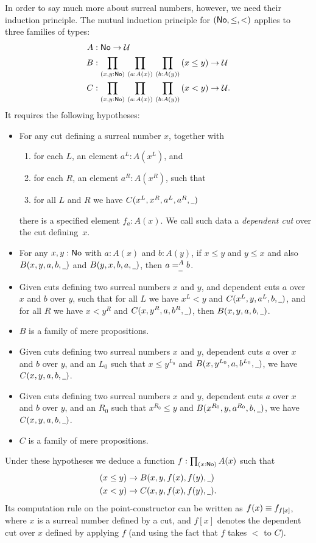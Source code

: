 In order to say much more about surreal numbers, however, we need their induction principle.
The mutual induction principle for $(\NO,\le,<)$ applies to three families of types:
\begin{align*}
  A &: \NO\to\type\\
  B &: \prd{x,y:\NO}{a:A(x)}{b:A(y)} (x\le y) \to \type\\
  C &: \prd{x,y:\NO}{a:A(x)}{b:A(y)} (x<y) \to \type.
\end{align*}
It requires the following hypotheses:
\begin{itemize}
\item For any cut defining a surreal number $x$, together with
  \begin{enumerate}
  \item for each $L$, an element $a^L:A(x^L)$, and
  \item for each $R$, an element $a^R:A(x^R)$, such that
  \item for all $L$ and $R$ we have $C(x^L,x^R,a^L,a^R,\blank)$
  \end{enumerate}
  there is a specified element $f_a:A(x)$.
  We call such data a \emph{dependent cut} over the cut defining~$x$.
\item For any $x,y:\NO$ with $a:A(x)$ and $b:A(y)$, if $x\le y$ and $y\le x$ and also $B(x,y,a,b,\blank)$ and $B(y,x,b,a,\blank)$, then $\dpath{A}{\blank}{a}{b}$.
\item Given cuts defining two surreal numbers $x$ and $y$, and dependent cuts $a$ over $x$ and $b$ over $y$, such that for all $L$ we have $x^L<y$ and $C(x^L,y,a^L,b,\blank)$, and for all $R$ we have $x<y^R$ and $C(x,y^R,a,b^R,\blank)$, then $B(x,y,a,b,\blank)$.
\item $B$ is a family of mere propositions.
\item Given cuts defining two surreal numbers $x$ and $y$, dependent cuts $a$ over $x$ and $b$ over $y$, and an $L_0$ such that $x\le y^{L_0}$ and $B(x,y^{L_0},a,b^{L_0},\blank)$, we have $C(x,y,a,b,\blank)$.
\item Given cuts defining two surreal numbers $x$ and $y$, dependent cuts $a$ over $x$ and $b$ over $y$, and an ${R_0}$ such that $x^{R_0}\le y$ and $B(x^{R_0},y,a^{R_0},b,\blank)$, we have $C(x,y,a,b,\blank)$.
\item $C$ is a family of mere propositions.
\end{itemize}
Under these hypotheses we deduce a function $f:\prd{x:\NO} A(x)$ such that
\begin{align*}
  (x\le y) &\to B(x,y,f(x),f(y),\blank)\\
  (x< y) &\to C(x,y,f(x),f(y),\blank).
\end{align*}
Its computation rule on the point-constructor can be written as $f(x) \jdeq f_{f[x]}$, where $x$ is a surreal number defined by a cut, and $f[x]$ denotes the dependent cut over $x$ defined by applying $f$ (and using the fact that $f$ takes $<$ to $C$).

